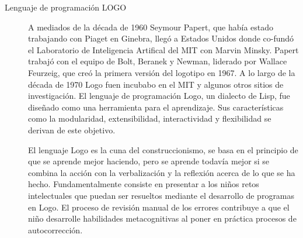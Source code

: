 \begin{description}

\item[Lenguaje de programación LOGO]  A mediados de la década de 1960 Seymour Papert, que había 
	estado trabajando con Piaget en Ginebra, llegó a Estados Unidos donde
	co-fundó el Laboratorio de Inteligencia Artifical del MIT con Marvin
	Minsky. Papert trabajó con el equipo de Bolt, Beranek y Newman, 
	liderado por Wallace Feurzeig, que creó la primera versión del logotipo
	en 1967. A lo largo de la década de 1970 Logo fuen incubabo en el MIT y 
	algunos otros sitios de investigación. El lenguaje de programación Logo,
	un dialecto de Lisp, fue diseñado como una herramienta para el aprendizaje.
	Sus características como la modularidad, extensibilidad, interactividad y 
	flexibilidad se derivan de este objetivo. 

	El lenguaje Logo es la cuna del construccionismo, se basa en el principio de que se aprende mejor
	haciendo, pero se aprende todavía mejor si se combina la acción con la
	verbalización  y la reflexión acerca de lo que se ha hecho. 
	Fundamentalmente consiste en presentar a los niños retos intelectuales
	que puedan ser resueltos mediante el desarrollo de programas en Logo. 
	El proceso de revisión manual de los errores contribuye a que el niño 
	desarrolle habilidades metacognitivas al poner en práctica procesos de 
	autocorrección\cite{logo:sg}.





\end{description}
